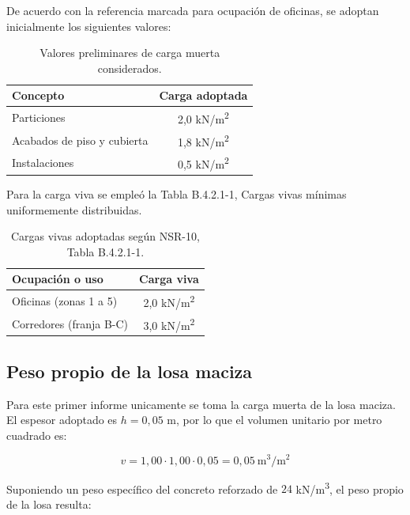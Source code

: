 ﻿\documentclass[12pt,letterpaper]{article}
\begin{document}
De acuerdo con la referencia marcada para ocupación de oficinas, se adoptan inicialmente los siguientes valores:

\begin{table}[H]
    \centering
    \begin{tabular}{>{\raggedright\arraybackslash}p{7cm} c}
        \toprule
        Concepto & Carga adoptada \\
        \midrule
        Particiones & 2,0 kN/m\textsuperscript{2} \\
        Acabados de piso y cubierta & 1,8 kN/m\textsuperscript{2} \\
        Instalaciones & 0,5 kN/m\textsuperscript{2} \\
        \bottomrule
    \end{tabular}
    \caption{Valores preliminares de carga muerta considerados.}
    \label{tab:cargas}
\end{table}

Para la carga viva se empleó la Tabla B.4.2.1-1, Cargas vivas mínimas uniformemente distribuidas.

\begin{table}[H]
    \centering
    \begin{tabular}{>{\raggedright\arraybackslash}p{7cm} c}
        \toprule
        Ocupación o uso & Carga viva \\
        \midrule
        Oficinas (zonas 1 a 5) & 2,0 kN/m\textsuperscript{2} \\
        Corredores (franja B-C) & 3,0 kN/m\textsuperscript{2} \\
        \bottomrule
    \end{tabular}
    \caption{Cargas vivas adoptadas según NSR-10, Tabla B.4.2.1-1.}
    \label{tab:cargas-vivas}
\end{table}

\subsection{Peso propio de la losa maciza}

Para este primer informe unicamente se toma la carga muerta de la losa maciza. El espesor adoptado es $h = 0{,}05$ m, por lo que el volumen unitario por metro cuadrado es:

\begin{equation}
v = 1{,}00 \cdot 1{,}00 \cdot 0{,}05 = 0{,}05 \ \text{m}^3/\text{m}^2
\end{equation}

Suponiendo un peso específico del concreto reforzado de $24$ kN/m\textsuperscript{3}, el peso propio de la losa resulta:
\end{document}
